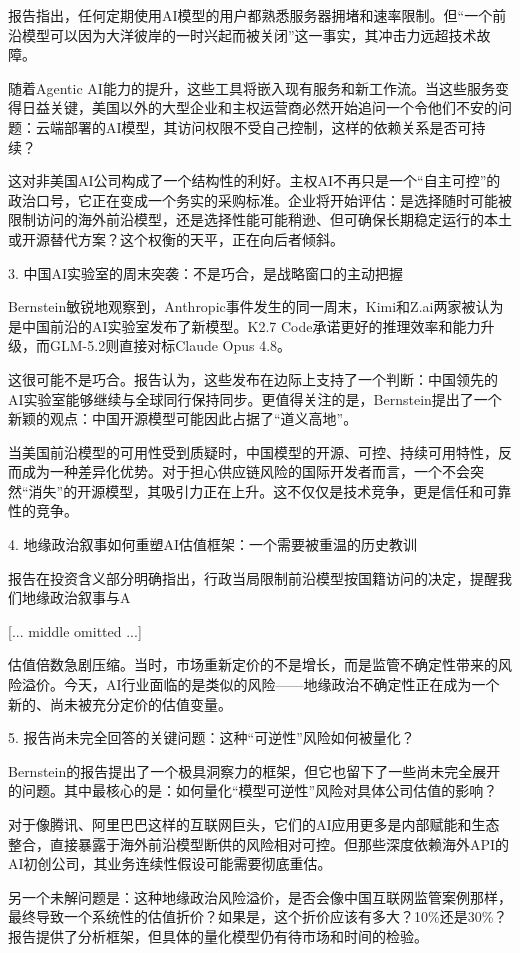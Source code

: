 \documentclass[11pt]{ctexart}
\begin{document}
报告指出，任何定期使用AI模型的用户都熟悉服务器拥堵和速率限制。但“一个前沿模型可以因为大洋彼岸的一时兴起而被关闭”这一事实，其冲击力远超技术故障。

随着Agentic AI能力的提升，这些工具将嵌入现有服务和新工作流。当这些服务变得日益关键，美国以外的大型企业和主权运营商必然开始追问一个令他们不安的问题：云端部署的AI模型，其访问权限不受自己控制，这样的依赖关系是否可持续？

这对非美国AI公司构成了一个结构性的利好。主权AI不再只是一个“自主可控”的政治口号，它正在变成一个务实的采购标准。企业将开始评估：是选择随时可能被限制访问的海外前沿模型，还是选择性能可能稍逊、但可确保长期稳定运行的本土或开源替代方案？这个权衡的天平，正在向后者倾斜。

3. 中国AI实验室的周末突袭：不是巧合，是战略窗口的主动把握

Bernstein敏锐地观察到，Anthropic事件发生的同一周末，Kimi和Z.ai两家被认为是中国前沿的AI实验室发布了新模型。K2.7 Code承诺更好的推理效率和能力升级，而GLM-5.2则直接对标Claude Opus 4.8。

这很可能不是巧合。报告认为，这些发布在边际上支持了一个判断：中国领先的AI实验室能够继续与全球同行保持同步。更值得关注的是，Bernstein提出了一个新颖的观点：中国开源模型可能因此占据了“道义高地”。

当美国前沿模型的可用性受到质疑时，中国模型的开源、可控、持续可用特性，反而成为一种差异化优势。对于担心供应链风险的国际开发者而言，一个不会突然“消失”的开源模型，其吸引力正在上升。这不仅仅是技术竞争，更是信任和可靠性的竞争。

4. 地缘政治叙事如何重塑AI估值框架：一个需要被重温的历史教训

报告在投资含义部分明确指出，行政当局限制前沿模型按国籍访问的决定，提醒我们地缘政治叙事与A

[... middle omitted ...]

估值倍数急剧压缩。当时，市场重新定价的不是增长，而是监管不确定性带来的风险溢价。今天，AI行业面临的是类似的风险——地缘政治不确定性正在成为一个新的、尚未被充分定价的估值变量。

5. 报告尚未完全回答的关键问题：这种“可逆性”风险如何被量化？

Bernstein的报告提出了一个极具洞察力的框架，但它也留下了一些尚未完全展开的问题。其中最核心的是：如何量化“模型可逆性”风险对具体公司估值的影响？

对于像腾讯、阿里巴巴这样的互联网巨头，它们的AI应用更多是内部赋能和生态整合，直接暴露于海外前沿模型断供的风险相对可控。但那些深度依赖海外API的AI初创公司，其业务连续性假设可能需要彻底重估。

另一个未解问题是：这种地缘政治风险溢价，是否会像中国互联网监管案例那样，最终导致一个系统性的估值折价？如果是，这个折价应该有多大？10\%还是30\%？报告提供了分析框架，但具体的量化模型仍有待市场和时间的检验。
\end{document}
